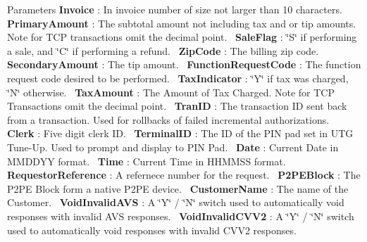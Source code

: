 \begin{DoxyParams}{Parameters}
 {\bfseries Invoice} \+: In invoice number of size not larger than 10 characters.~\newline
 {\bfseries Primary\+Amount} \+: The subtotal amount not including tax and or tip amounts. Note for T\+CP transactions omit the decimal point.~\newline
 {\bfseries Sale\+Flag} \+: \char`\"{}\+S\char`\"{} if performing a sale, and \char`\"{}\+C\char`\"{} if performing a refund.~\newline
 {\bfseries Zip\+Code} \+: The billing zip code.~\newline
 {\bfseries Secondary\+Amount} \+: The tip amount.~\newline
 {\bfseries Function\+Request\+Code} \+: The function request code desired to be performed.~\newline
 {\bfseries Tax\+Indicator} \+: \char`\"{}\+Y\char`\"{} if tax was charged, \char`\"{}\+N\char`\"{} otherwise.~\newline
 {\bfseries Tax\+Amount} \+: The Amount of Tax Charged. Note for T\+CP Transactions omit the decimal point.~\newline
 {\bfseries Tran\+ID} \+: The transaction ID sent back from a transaction. Used for rollbacks of failed incremental authorizations.~\newline
 {\bfseries Clerk} \+: Five digit clerk ID.~\newline
 {\bfseries Terminal\+ID} \+: The ID of the P\+IN pad set in U\+TG Tune-\/\+Up. Used to prompt and display to P\+IN Pad.~\newline
 {\bfseries Date} \+: Current Date in M\+M\+D\+D\+YY format.~\newline
 {\bfseries Time} \+: Current Time in H\+H\+M\+M\+SS format.~\newline
 {\bfseries Requestor\+Reference} \+: A refernece number for the request.~\newline
 {\bfseries P2\+P\+E\+Block} \+: The P2\+PE Block form a native P2\+PE device.~\newline
 {\bfseries Customer\+Name} \+: The name of the Customer.~\newline
 {\bfseries Void\+Invalid\+A\+VS} \+: A \char`\"{}\+Y\char`\"{} / \char`\"{}\+N\char`\"{} switch used to automatically void responses with invalid A\+VS responses.~\newline
 {\bfseries Void\+Invalid\+C\+V\+V2} \+: A \char`\"{}\+Y\char`\"{} / \char`\"{}\+N\char`\"{} switch used to automatically void responses with invalid C\+V\+V2 responses.~\newline

\end{DoxyParams}
